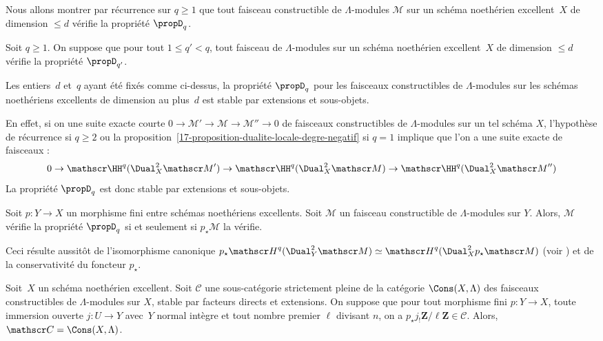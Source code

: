 \documentclass[10pt]{../fichiers-configuration-latex/smfart}
\begin{document}
Nous allons montrer par récurrence sur $q\geq 1$ que tout faisceau
constructible de $\Lambda$-modules $\mathscr M$ sur un schéma noethérien
excellent $X$ de dimension $\leq d$ vérifie la propriété $\propD_q$.

Soit $q\geq 1$. On suppose que pour tout $1\leq q'<q$, tout faisceau de
$\Lambda$-modules sur un schéma noethérien excellent $X$ de dimension $\leq
d$ vérifie la propriété $\propD_{q'}$.

\begin{lemme2}\label{17-lemme-propriete-d-extensions-et-sous-objets}
Les entiers $d$ et $q$ ayant été fixés comme ci-dessus, la propriété
$\propD_q$ pour les faisceaux constructibles de $\Lambda$-modules sur les
schémas noethériens excellents de dimension au plus $d$ est stable par
extensions et sous-objets.
\end{lemme2}

En effet, si on une suite
exacte courte $0\to{\mathscr M}'\to\mathscr M\to {\mathscr M}''\to 0$
de faisceaux constructibles de $\Lambda$-modules sur un
tel schéma $X$, l'hypothèse de récurrence si $q\geq 2$ ou la
proposition~\ref{17-proposition-dualite-locale-degre-negatif} si $q=1$
implique que l'on a une suite exacte de faisceaux :
\[0\to \mathscr \HH^q(\Dual_X^2{\mathscr M}')\to 
\mathscr \HH^q(\Dual_X^2{\mathscr M})\to
\mathscr \HH^q(\Dual_X^2{\mathscr M}'')\]
La propriété $\propD_q$ est donc stable par extensions et sous-objets.

\begin{lemme2}\label{17-lemme-propriete-d-et-morphismes-finis}
Soit $p\colon Y\to X$ un morphisme fini entre schémas noethériens
excellents. Soit $\mathscr M$ un faisceau constructible de
$\Lambda$-modules sur $Y$. Alors, $\mathscr M$ vérifie la propriété
$\propD_q$ si et seulement si $p_\star\mathscr M$ la vérifie.
\end{lemme2}

Ceci résulte aussitôt de l'isomorphisme canonique
$p_\star {\mathscr H}^q(\Dual_Y^2\mathscr M)\simeq {\mathscr
H}^q(\Dual_X^2p_\star \mathscr M)$ (voir )
et de la conservativité du foncteur $p_\star$.

\begin{lemme2}\label{17-lemme-devissage-standard-normal}
Soit $X$ un schéma noethérien excellent. 
Soit $\mathscr C$ une sous-catégorie strictement pleine de la catégorie
$\Cons(X,\Lambda)$ des faisceaux constructibles de $\Lambda$-modules sur
$X$, stable par facteurs directs et extensions. On suppose que pour tout
morphisme fini $p\colon Y\to X$, toute immersion ouverte $j\colon U\to Y$
avec $Y$ normal intègre
et tout nombre premier $\ell$ divisant $n$, on a $p_\star j_!
\mathbf{Z}/\ell\mathbf{Z}\in\mathscr C$. Alors, $\mathscr
C=\Cons(X,\Lambda)$.
\end{lemme2}
\end{document}
